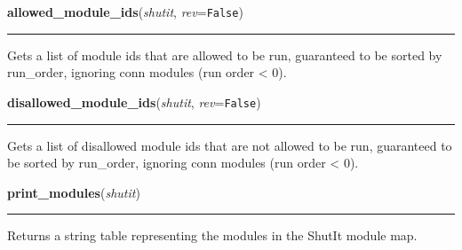 \hspace{.8\funcindent}\begin{boxedminipage}{\funcwidth}

    \raggedright \textbf{allowed\_module\_ids}(\textit{shutit}, \textit{rev}={\tt False})

    \vspace{-1.5ex}

    \rule{\textwidth}{0.5\fboxrule}
\setlength{\parskip}{2ex}
    Gets a list of module ids that are allowed to be run, guaranteed to be 
    sorted by run\_order, ignoring conn modules (run order {\textless} 0).

\setlength{\parskip}{1ex}
    \end{boxedminipage}

    \label{shutit_main:disallowed_module_ids}

    \vspace{0.5ex}

\hspace{.8\funcindent}\begin{boxedminipage}{\funcwidth}

    \raggedright \textbf{disallowed\_module\_ids}(\textit{shutit}, \textit{rev}={\tt False})

    \vspace{-1.5ex}

    \rule{\textwidth}{0.5\fboxrule}
\setlength{\parskip}{2ex}
    Gets a list of disallowed module ids that are not allowed to be run, 
    guaranteed to be sorted by run\_order, ignoring conn modules (run order
    {\textless} 0).

\setlength{\parskip}{1ex}
    \end{boxedminipage}

    \label{shutit_main:print_modules}

    \vspace{0.5ex}

\hspace{.8\funcindent}\begin{boxedminipage}{\funcwidth}

    \raggedright \textbf{print\_modules}(\textit{shutit})

    \vspace{-1.5ex}

    \rule{\textwidth}{0.5\fboxrule}
\setlength{\parskip}{2ex}
    Returns a string table representing the modules in the ShutIt module 
    map.

\setlength{\parskip}{1ex}
    \end{boxedminipage}

